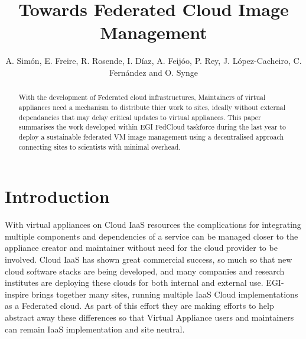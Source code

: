 \documentclass{llncs_Ibergrid2013}
\begin{document}
%
\frontmatter          %
%
\pagestyle{headings}  %
%
\mainmatter              %
%
\title{Towards Federated Cloud Image Management}
%
%
\author{A. Sim\'on, E. Freire, R. Rosende, I. D\'iaz, A. Feij\'oo, P. Rey, J. L\'opez-Cacheiro, C. Fern\'andez and O. Synge}
%
%
%




\maketitle              %

\begin{abstract}
With the development of Federated cloud infrastructures, Maintainers of virtual appliances need a mechanism to distribute thier work to sites, ideally without external dependancies that may delay critical updates to virtual appliances. This paper summarises the work developed within EGI FedCloud taskforce during the last year to deploy a sustainable federated VM image management using a decentralised approach connecting sites to scientists with minimal overhead.
\end{abstract}

%
\section{Introduction}
\label{sect-introduction}
%
With virtual appliances on Cloud IaaS resources the complications for integrating multiple components and dependencies of a service can be managed closer to the appliance creator and maintainer without need for the cloud provider to be involved. Cloud IaaS has shown great commercial success, so much so that new cloud software stacks are being developed, and many companies and research institutes are deploying these clouds for both internal and external use. EGI-inspire brings together many sites, running multiple IaaS Cloud implementations as a Federated cloud. As part of this effort they are making efforts to help abstract away these differences so that Virtual Appliance users and maintainers can remain IaaS implementation and site neutral.
\end{document}
